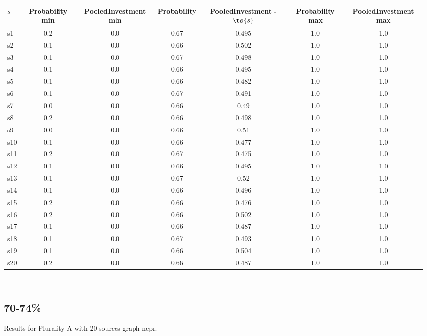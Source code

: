 \documentclass{article}
\begin{document}
\noindent\begin{tabular}{|l|c|c|c|c|c|c|}
\hline
$s$& Probability min & PooledInvestment min & Probability & PooledInvestment - $\ts{s}$ & Probability max & PooledInvestment max\\
\hline
s1 &0.2 & 0.0 & 0.67 & 0.495 & 1.0 & 1.0\\
\hline
s2 &0.1 & 0.0 & 0.66 & 0.502 & 1.0 & 1.0\\
\hline
s3 &0.1 & 0.0 & 0.67 & 0.498 & 1.0 & 1.0\\
\hline
s4 &0.1 & 0.0 & 0.66 & 0.495 & 1.0 & 1.0\\
\hline
s5 &0.1 & 0.0 & 0.66 & 0.482 & 1.0 & 1.0\\
\hline
s6 &0.1 & 0.0 & 0.67 & 0.491 & 1.0 & 1.0\\
\hline
s7 &0.0 & 0.0 & 0.66 & 0.49 & 1.0 & 1.0\\
\hline
s8 &0.2 & 0.0 & 0.66 & 0.498 & 1.0 & 1.0\\
\hline
s9 &0.0 & 0.0 & 0.66 & 0.51 & 1.0 & 1.0\\
\hline
s10 &0.1 & 0.0 & 0.66 & 0.477 & 1.0 & 1.0\\
\hline
s11 &0.2 & 0.0 & 0.67 & 0.475 & 1.0 & 1.0\\
\hline
s12 &0.1 & 0.0 & 0.66 & 0.495 & 1.0 & 1.0\\
\hline
s13 &0.1 & 0.0 & 0.67 & 0.52 & 1.0 & 1.0\\
\hline
s14 &0.1 & 0.0 & 0.66 & 0.496 & 1.0 & 1.0\\
\hline
s15 &0.2 & 0.0 & 0.66 & 0.476 & 1.0 & 1.0\\
\hline
s16 &0.2 & 0.0 & 0.66 & 0.502 & 1.0 & 1.0\\
\hline
s17 &0.1 & 0.0 & 0.66 & 0.487 & 1.0 & 1.0\\
\hline
s18 &0.1 & 0.0 & 0.67 & 0.493 & 1.0 & 1.0\\
\hline
s19 &0.1 & 0.0 & 0.66 & 0.504 & 1.0 & 1.0\\
\hline
s20 &0.2 & 0.0 & 0.66 & 0.487 & 1.0 & 1.0\\
\hline
\end{tabular}\\

\newpage

\subsection{70-74\%}

\noindent Results for Plurality A with 20 sources graph ncpr.
\end{document}

